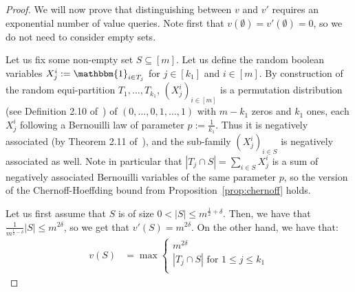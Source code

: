 \begin{proof}
  We will now prove that distinguishing between $v$ and $v'$ requires an exponential number of value queries. Note first that $v(\emptyset) = v'(\emptyset) = 0$, so we do not need to consider empty sets.

  Let us fix some non-empty set $S \subseteq [m]$. Let us define the random boolean variables $X_j^i := \mathbbm{1}_{i \in T_j}$ for $j \in [k_1]$ and $i \in [m]$. By construction of the random equi-partition $T_1, \ldots, T_{k_1}$, $(X_j^i)_{i \in [m]}$ is a permutation distribution (see Definition 2.10 of~\cite{JP83}) of $(0,\ldots,0,1,\ldots,1)$ with $m-k_1$ zeros and $k_1$ ones, each $X_j^i$ following a Bernouilli law of parameter $p := \frac{1}{k_1}$. Thus it is negatively associated (by Theorem 2.11 of~\cite{JP83}), and the sub-family $(X_j^i)_{i \in S}$ is negatively associated as well. Note in particular that $|T_j \cap S| = \sum_{i \in S} X_j^i$ is a sum of negatively associated Bernouilli variables of the same parameter $p$, so the version of the Chernoff-Hoeffding bound from Proposition~\ref{prop:chernoff} holds.
  
  Let us first assume that $S$ is of size $0 < |S| \leq m^{\frac{1}{2}+\delta}$. Then, we have that $\frac{1}{m^{\frac{1}{2}-\delta}}|S| \leq m^{2\delta}$, so we get that $v'(S) = m^{2\delta}$. On the other hand, we have that:
    \begin{equation}
    \begin{aligned}
      v(S) &= \max\begin{cases}
      m^{2\delta}\\
      |T_j \cap S| \text{ for } 1 \leq j \leq k_1\\
      \end{cases}
    \end{aligned}
    \end{equation}


\end{proof}
